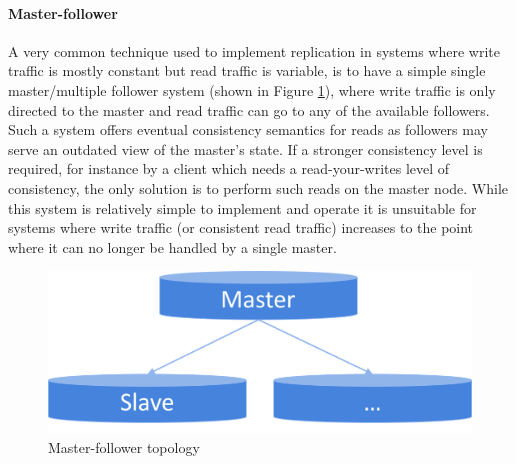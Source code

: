 \paragraph{Master-follower}
A very common technique used to implement replication in systems where write traffic is mostly constant but read traffic is variable, is to have a simple single master/multiple follower system (shown in Figure \ref{fig:master-follower}), where write traffic is only directed to the master and read traffic can go to any of the available followers.
Such a system offers eventual consistency semantics for reads as followers may serve an outdated view of the master's state.
If a stronger consistency level is required, for instance by a client which needs a read-your-writes level of consistency, the only solution is to perform such reads on the master node.
While this system is relatively simple to implement and operate it is unsuitable for systems where write traffic (or consistent read traffic) increases to the point where it can no longer be handled by a single master.

\begin{figure}[h]
\caption{Master-follower topology}
\label{fig:master-follower}
\centering
\includegraphics[width=1.0\textwidth]{images/master-slave.png}
\end{figure}


